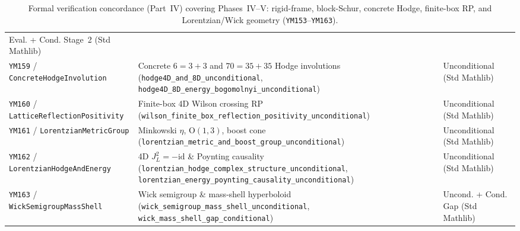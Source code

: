 \documentclass[11pt,a4paper]{article}
\begin{document}
\begin{table}[ht]
\begin{tabular}{@{}p{4.3cm}p{6.6cm}p{3.4cm}@{}}
Eval. + Cond. Stage~2 (Std Mathlib) \\
\texttt{YM159} / \texttt{ConcreteHodge\allowbreak Involution} &
Concrete $6{=}3{+}3$ and $70{=}35{+}35$ Hodge involutions (\texttt{hodge4D\_\allowbreak and\_\allowbreak 8D\_\allowbreak unconditional}, \texttt{hodge4D\_\allowbreak 8D\_\allowbreak energy\_\allowbreak bogomolnyi\_\allowbreak unconditional}) &
Unconditional (Std Mathlib) \\
\texttt{YM160} / \texttt{LatticeReflection\allowbreak Positivity} &
Finite-box 4D Wilson crossing RP (\texttt{wilson\_\allowbreak finite\_\allowbreak box\_\allowbreak reflection\_\allowbreak positivity\_\allowbreak unconditional}) &
Unconditional (Std Mathlib) \\
\texttt{YM161} / \texttt{LorentzianMetric\allowbreak Group} &
Minkowski $\eta$, $\mathrm{O}(1,3)$, boost cone (\texttt{lorentzian\_\allowbreak metric\_\allowbreak and\_\allowbreak boost\_\allowbreak group\_\allowbreak unconditional}) &
Unconditional (Std Mathlib) \\
\texttt{YM162} / \texttt{LorentzianHodge\allowbreak AndEnergy} &
4D $J_L^2{=}-\mathrm{id}$ \& Poynting causality (\texttt{lorentzian\_\allowbreak hodge\_\allowbreak complex\_\allowbreak structure\_\allowbreak unconditional}, \texttt{lorentzian\_\allowbreak energy\_\allowbreak poynting\_\allowbreak causality\_\allowbreak unconditional}) &
Unconditional (Std Mathlib) \\
\texttt{YM163} / \texttt{WickSemigroup\allowbreak MassShell} &
Wick semigroup \& mass-shell hyperboloid (\texttt{wick\_\allowbreak semigroup\_\allowbreak mass\_\allowbreak shell\_\allowbreak unconditional}, \texttt{wick\_\allowbreak mass\_\allowbreak shell\_\allowbreak gap\_\allowbreak conditional}) &
Uncond. + Cond. Gap (Std Mathlib) \\
\hline
\end{tabular}
\caption{Formal verification concordance (Part~IV) covering Phases~IV--V: rigid-frame, block-Schur, concrete Hodge, finite-box RP, and Lorentzian/Wick geometry (\texttt{YM153}--\texttt{YM163}).}
\label{tab:paper4-concordance-phase45}
\end{table}
\end{document}
